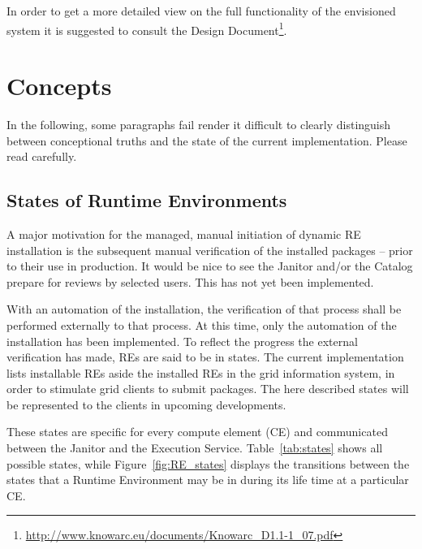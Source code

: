 In order to get a more detailed view on the full functionality of the envisioned system it is suggested to consult the 
Design Document\footnote{\href{http://www.knowarc.eu/documents/Knowarc_D1.1-1_07.pdf}
{http://www.knowarc.eu/documents/Knowarc\_D1.1-1\_07.pdf}}.

\section{Concepts}

In the following, some paragraphs fail render it difficult to 
clearly distinguish between conceptional truths and the state
of the current implementation. Please read carefully.

\subsection{States of Runtime Environments}

A major motivation for the managed, manual initiation of dynamic RE
installation is the subsequent manual verification of the installed
packages -- prior to their use in production. It would be nice to
see the Janitor and/or the Catalog prepare for reviews by selected
users. This has not yet been implemented.

With an automation of the installation, the verification of
that process shall be performed externally to that process.  At this
time, only the automation of the installation has been implemented.
To reflect the progress the external verification has made, REs
are said to be in states. The current implementation lists
installable REs aside the installed REs in the grid information system,
in order to stimulate grid clients to submit packages. The here described
states will be represented to the clients in upcoming developments.

These states are specific for every compute element (CE) and communicated
between the Janitor and the Execution Service. Table~\ref{tab:states}
shows all
possible states, while Figure~\ref{fig:RE_states}
displays the transitions between the states that a Runtime Environment may
be in during its life time at a particular CE.

